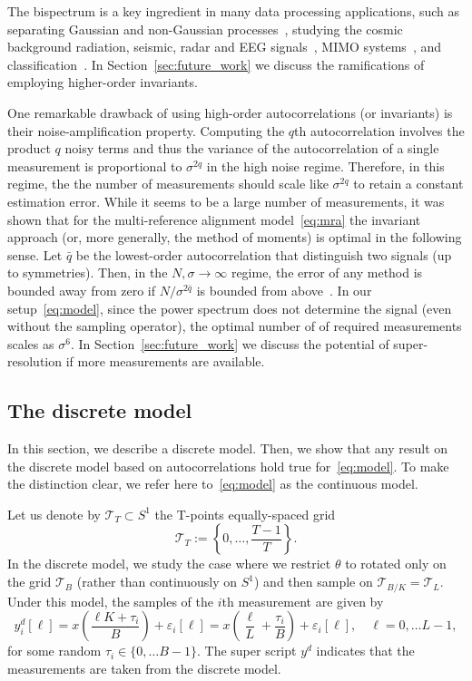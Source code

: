 \documentclass[english,12pt]{article}
\newcommand{\T}{\mathcal{T}}
\numberwithin{equation}{section}
\numberwithin{thm}{section} %
\begin{document}
The bispectrum is a key ingredient in many data processing applications, such as separating Gaussian and non-Gaussian processes~\cite{brockett1988bispectral}, studying the cosmic background
radiation, seismic, radar and EEG signals~\cite{wang2000cosmic,chen2008feature,ning1989bispectral}, MIMO systems~\cite{chen2001frequency}, and classification~\cite{zhao2014rotationally}.  
In Section~\ref{sec:future_work} we discuss the ramifications of employing higher-order invariants.  

One remarkable drawback of using high-order autocorrelations (or invariants) is their noise-amplification property. Computing the $q$th  autocorrelation involves the product $q$ noisy terms and thus the variance of the autocorrelation of a single measurement is proportional to $\sigma^{2q}$ in the high noise regime. Therefore, in this regime, the the number of measurements should scale like $\sigma^{2q}$ to retain a constant estimation error. While it seems to be a large number of measurements, it was shown that for the multi-reference alignment model~\eqref{eq:mra} the invariant approach (or, more generally, the method of moments) is optimal in the following sense. Let $\bar{q}$ be the lowest-order autocorrelation that distinguish two signals (up to symmetries). Then, in the $N,\sigma\to\infty$ regime, the error of any method is bounded away from zero if  $N/\sigma^{2\bar{q}}$ is bounded from above~\cite{bandeira2017optimal,abbe2018estimation}. 
In our setup~\eqref{eq:model}, since the power spectrum does not determine the signal (even without the sampling operator), the optimal number of of required measurements scales as $\sigma^6$. In Section~\ref{sec:future_work} we discuss the potential of super-resolution if more measurements are available.


\subsection{The discrete model} \label{sec:discrete_analysis}

In this section, we describe a discrete model. Then, we show that
any result on the discrete model based on autocorrelations hold true for~\eqref{eq:model}. To make the distinction clear, we refer here to~\eqref{eq:model} as the continuous model.

Let us denote by $\T_T\subset S^1$ the T-points equally-spaced grid 
 \begin{equation} \label{eq:grid}
 \mathcal{T}_T:=\left\{0,\ldots,\frac{T-1}{T}\right\}.
 \end{equation}
 In the discrete model, we study the case where we restrict $\theta$ to rotated only on the grid $\T_B$ (rather than continuously on $S^1$) and then sample on $\T_{B/K}=\T_{L}$.
 Under this model, the samples of the $i$th measurement are given by
 \begin{equation} \label{eq:discrete_model}
 y_i^d[\ell] = x\left(\frac{\ell K+\tau_i}{B}\right) + \varepsilon_i[\ell]=x\left(\frac{\ell}{L} + \frac{\tau_i}{B}\right)+\varepsilon_i[\ell], \quad \ell=0,\ldots L-1,
 \end{equation}
 for some random $\tau_i\in\{0,\ldots B-1\}$. The super script $y^d$ indicates that the measurements are taken from the discrete model. 
\end{document}
